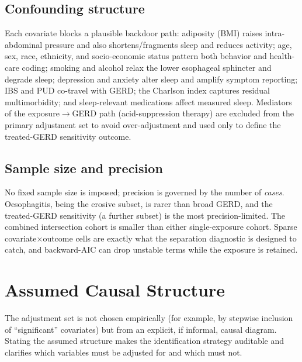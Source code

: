 \documentclass[11pt]{article}
\begin{document}
\subsection{Confounding structure}
Each covariate blocks a plausible backdoor path: adiposity (BMI) raises intra-abdominal pressure and
also shortens/fragments sleep and reduces activity; age, sex, race, ethnicity, and socio-economic
status pattern both behavior and health-care coding; smoking and alcohol relax the lower esophageal
sphincter and degrade sleep; depression and anxiety alter sleep and amplify symptom reporting; IBS and
PUD co-travel with GERD; the Charlson index captures residual multimorbidity; and sleep-relevant
medications affect measured sleep. Mediators of the exposure$\rightarrow$GERD path (acid-suppression
therapy) are excluded from the primary adjustment set to avoid over-adjustment and used only to define
the treated-GERD sensitivity outcome.

\subsection{Sample size and precision}
No fixed sample size is imposed; precision is governed by the number of \emph{cases}. Oesophagitis,
being the erosive subset, is rarer than broad GERD, and the treated-GERD sensitivity (a further subset)
is the most precision-limited. The combined intersection cohort is smaller than either single-exposure
cohort. Sparse covariate$\times$outcome cells are exactly what the separation diagnostic is designed to
catch, and backward-AIC can drop unstable terms while the exposure is retained.

\section{Assumed Causal Structure}
The adjustment set is not chosen empirically (for example, by stepwise inclusion of ``significant''
covariates) but from an explicit, if informal, causal diagram. Stating the assumed structure makes the
identification strategy auditable and clarifies which variables must be adjusted for and which must not.
\end{document}
